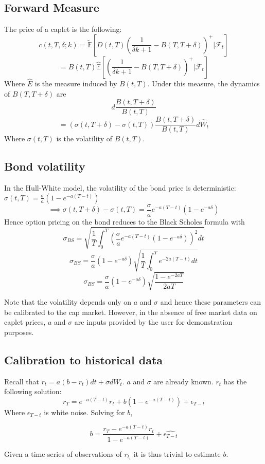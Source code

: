 \documentclass{article}
\theoremstyle{definition}
\begin{document}
\subsection{Forward Measure}
The price of a caplet is the following:
\[c(t, T, \delta; k)=\mathbb{\tilde{E}}\left[D(t, T)\left(\frac{1}{\delta k+1}-B(T, T+\delta)\right)^+ |\mathcal{F}_t\right]\]
\[=B(t, T)\mathbb{\hat{E}}\left[\left(\frac{1}{\delta k+1}-B(T, T+\delta)\right)^+ |\mathcal{F}_t\right]\]
Where \(\hat{E}\) is the measure induced by \(B(t, T)\).  Under this measure, the dynamics of \(B(T, T+\delta)\) are 
\[d\frac{B(t, T+\delta)}{B(t, T)}\]
\[=\left(\sigma(t, T+\delta)-\sigma(t, T)\right) \frac{B(t, T+\delta)}{B(t, T)}d\hat{W}_t\]
Where \(\sigma(t, T)\) is the volatility of \(B(t, T)\).

\subsection{Bond volatility} \label{bondvolatility}
In the Hull-White model, the volatility of the bond price is deterministic: \(\sigma(t, T)=\frac{\sigma}{a}(1-e^{-a(T-t)})\)
\[\implies \sigma(t, T+\delta)-\sigma(t, T)=\frac{\sigma}{a}e^{-a(T-t)}\left(1-e^{-a\delta}\right)\]
Hence option pricing on the bond reduces to the Black Scholes formula with \[\sigma_{BS}=\sqrt{\frac{1}{T} \int_0 ^ T \left(\frac{\sigma}{a}e^{-a(T-t)}\left(1-e^{-a\delta}\right)\right)^2 dt}\]
\[\sigma_{BS}=\frac{\sigma}{a}\left(1-e^{-a\delta}\right)\sqrt{\frac{1}{T} \int_0 ^ T e^{-2a(T-t)} dt}\]
\[\sigma_{BS}=\frac{\sigma}{a}\left(1-e^{-a\delta}\right)\sqrt{\frac{1-e^{-2aT}}{2aT}}\]

Note that the volatility depends only on \(a\) and \(\sigma\) and hence these parameters can be calibrated to the cap market. However, in the absence of free market data on caplet prices, \(a\) and \(\sigma\) are inputs provided by the user for demonstration purposes.  

\subsection{Calibration to historical data}
 Recall that \(r_t=a(b-r_t)dt+\sigma dW_t\).  \(a\) and \(\sigma\) are already known.  \(r_t\) has the following solution:
\[r_T= e^{-a(T-t)}r_t+b\left(1-e^{-a(T-t)}\right)+\epsilon_{T-t}\]
Where \(\epsilon_{T-t}\) is white noise.  Solving for \(b\),

\[b=\frac{r_T-e^{-a(T-t)}r_t}{1-e^{-a(T-t)}}+\hat{\epsilon_{T-t}}\]

Given a time series of observations of \(r_{t_i}\) it is thus trivial to estimate \(b\).
\end{document}
